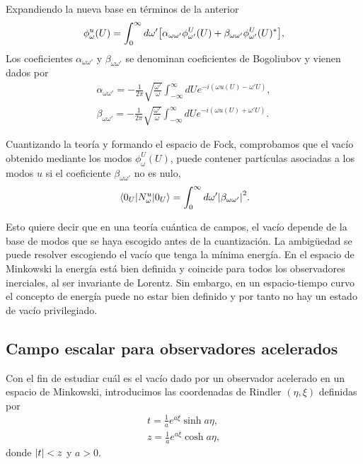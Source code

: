 Expandiendo la nueva base en términos de la anterior
\begin{equation}
  \phi_\omega^u(U) = \int_0^\infty d\omega'\qty[ \alpha_{\omega\omega'} \phi_{\omega'}^U(U) 
  +\beta_{\omega\omega'} \phi_{\omega'}^U(U)^*],
\end{equation}
Los coeficientes $\alpha_{\omega\omega'}$ y $\beta_{\omega\omega'}$ se denominan coeficientes
de Bogoliubov y vienen dados por
\begin{gather}
  \alpha_{\omega\omega'} = -\frac{1}{2\pi}\sqrt{\frac{\omega'}{\omega}}\int_{-\infty}^\infty dU e^{-i(\omega u(U) -\omega' U)},\\
  \beta_{\omega\omega'} = -\frac{1}{2\pi}\sqrt{\frac{\omega'}{\omega}}\int_{-\infty}^\infty dU e^{-i(\omega u(U) +\omega' U)}.
\end{gather}

Cuantizando la teoría y formando el espacio de Fock, comprobamos que el vacío obtenido mediante
los modos $\phi^U_\omega (U)$, puede contener partículas asociadas a los modos $u$
si el coeficiente $\beta_{\omega\omega'}$ no es nulo,
\begin{equation}
  \ev{N_\omega^u}{0_U}=\int_0^\infty d\omega' \abs{\beta_{\omega\omega'}}^2.
\end{equation}

Esto quiere decir que en una teoría cuántica de campos, el vacío depende de la base de modos
que se haya escogido antes de la cuantización.
La ambigüedad se puede resolver escogiendo el vacío que tenga la mínima energía.
En el espacio de Minkowski la energía está bien definida y coincide para todos los observadores
inerciales, al ser invariante de Lorentz.
Sin embargo, en un espacio-tiempo curvo el concepto de energía puede no estar bien definido
y por tanto no hay un estado de vacío privilegiado.

\subsection{Campo escalar para observadores acelerados}

Con el fin de estudiar cuál es el vacío dado por un observador acelerado en un espacio de 
Minkowski, introducimos las coordenadas de Rindler $(\eta,\xi)$ definidas por
\begin{gather}
  t=\frac{1}{a} e^{a\xi} \sinh a\eta,\\
  z=\frac{1}{a}e^{a\xi} \cosh a\eta,
  \label{eq:rindler}
\end{gather}
donde $\abs{t}<z$ y $a>0$.

